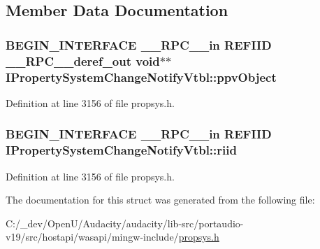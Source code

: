 \subsection{Member Data Documentation}
\subsubsection[{\texorpdfstring{ppv\+Object}{ppvObject}}]{\setlength{\rightskip}{0pt plus 5cm}B\+E\+G\+I\+N\+\_\+\+I\+N\+T\+E\+R\+F\+A\+CE {\bf \+\_\+\+\_\+\+R\+P\+C\+\_\+\+\_\+in} {\bf R\+E\+F\+I\+ID} {\bf \+\_\+\+\_\+\+R\+P\+C\+\_\+\+\_\+deref\+\_\+out} {\bf void}$\ast$$\ast$ I\+Property\+System\+Change\+Notify\+Vtbl\+::ppv\+Object}\hypertarget{struct_i_property_system_change_notify_vtbl_a40c2991867bfb557592b38549db3bd25}{}\label{struct_i_property_system_change_notify_vtbl_a40c2991867bfb557592b38549db3bd25}


Definition at line 3156 of file propsys.\+h.

\subsubsection[{\texorpdfstring{riid}{riid}}]{\setlength{\rightskip}{0pt plus 5cm}B\+E\+G\+I\+N\+\_\+\+I\+N\+T\+E\+R\+F\+A\+CE {\bf \+\_\+\+\_\+\+R\+P\+C\+\_\+\+\_\+in} {\bf R\+E\+F\+I\+ID} I\+Property\+System\+Change\+Notify\+Vtbl\+::riid}\hypertarget{struct_i_property_system_change_notify_vtbl_afb7778583ef940af023a33f3d7cd0a26}{}\label{struct_i_property_system_change_notify_vtbl_afb7778583ef940af023a33f3d7cd0a26}


Definition at line 3156 of file propsys.\+h.



The documentation for this struct was generated from the following file\+:\begin{DoxyCompactItemize}
\item 
C\+:/\+\_\+dev/\+Open\+U/\+Audacity/audacity/lib-\/src/portaudio-\/v19/src/hostapi/wasapi/mingw-\/include/\hyperlink{propsys_8h}{propsys.\+h}\end{DoxyCompactItemize}
